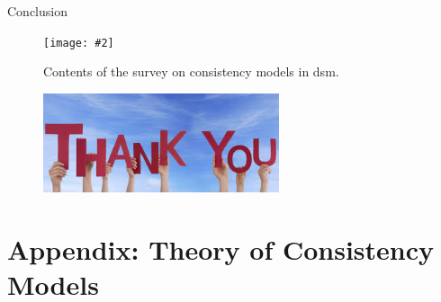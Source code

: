 \documentclass{beamer}
\newcommand{\fig}[3]
{
  \begin{figure}[htp]
    \centering
      \texttt{[image: \#2]}
      \caption[labelInTOC]{#3}
  \end{figure}
}
\newcommand{\backupbegin}
{
   \newcounter{framenumbervorappendix}
   \setcounter{framenumbervorappendix}{\value{framenumber}}
}
\begin{document}
\begin{frame}{Conclusion}
  \fig{width = 0.90\textwidth}{fig/survey-contents.pdf}{Contents of the survey
  on consistency models in dsm.}
\end{frame}
\begin{frame}[noframenumbering]
  \begin{figure}[htp]
	\centering
	\includegraphics[width = 0.618\textwidth]{fig/thankyou.jpg}
  \end{figure}
\end{frame}
\appendix

\section{Appendix: Theory of Consistency Models}
\end{document}
